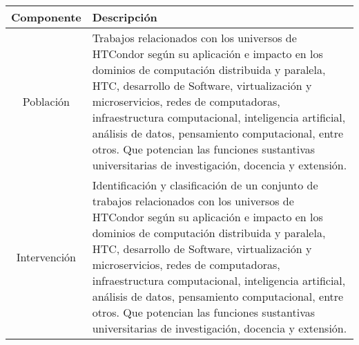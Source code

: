 \begin{table}[H]
	\centering
	\renewcommand{\arraystretch}{1.2} %
	\footnotesize %
	\begin{tabular}{|c|p{12cm}|} %
		\hline
		\textbf{Componente} & \textbf{Descripción}                                                                                                                                                                                                                                                                                                                                                                                                                                                                             \\ \hline

		Población           & Trabajos relacionados con los universos de HTCondor según su aplicación e impacto en los dominios de computación distribuida y paralela, HTC, desarrollo de Software, virtualización y microservicios, redes de computadoras, infraestructura computacional, inteligencia artificial, análisis de datos, pensamiento computacional, entre otros. Que potencian las funciones sustantivas universitarias de investigación, docencia y extensión.                                                  \\ \hline

		Intervención        & Identificación y clasificación de un conjunto de trabajos relacionados con los universos de HTCondor según su aplicación e impacto en los dominios de computación distribuida y paralela, HTC, desarrollo de Software, virtualización y microservicios, redes de computadoras, infraestructura computacional, inteligencia artificial, análisis de datos, pensamiento computacional, entre otros. Que potencian las funciones sustantivas universitarias de investigación, docencia y extensión. \\ \hline


\end{tabular}
\end{table}

